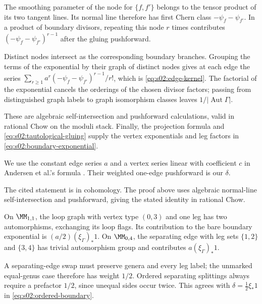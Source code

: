 \begin{prf}
The smoothing parameter of the node for $\{f,f'\}$ belongs to the
tensor product of its two tangent lines.  Its normal line therefore
has first Chern class $-\psi_f-\psi_{f'}$.  In a product of boundary
divisors, repeating this node $r$ times contributes
$(-\psi_f-\psi_{f'})^{r-1}$ after the gluing pushforward.

\smallskip\noindent Distinct nodes intersect as the corresponding boundary branches.
Grouping the terms of the exponential by their graph of distinct
nodes gives at each edge the series
$\sum_{r\geq1}a^r(-\psi_f-\psi_{f'})^{r-1}/r!$, which is
\eqref{eq:s02:edge-kernel}.  The factorial of the exponential cancels
the orderings of the chosen divisor factors; passing from distinguished
graph labels to graph isomorphism classes leaves
$1/|\operatorname{Aut}\Gamma|$.

\smallskip\noindent These are algebraic self-intersection and pushforward calculations,
valid in rational Chow on the moduli stack.  Finally, the projection
formula and \eqref{eq:s02:tautological-gluing} supply the vertex
exponentials and leg factors in \eqref{eq:s02:boundary-exponential}.
\end{prf}

\begin{rmk}
\label{rmk:s02:boundary-source}
We use the constant edge series $a$ and a vertex series linear with
coefficient $c$ in Andersen et al.'s formula
\cite[Lemma 3.10, (3.18)--(3.22)]{ABCDGLW23}.
Their weighted one-edge pushforward is our $\delta$.

The cited statement is in cohomology.  The proof above uses algebraic
normal-line self-intersection and pushforward, giving the stated
identity in rational Chow.
\end{rmk}

\begin{exm}
\label{exm:s02:one-edge-weights}
On $\MM_{1,1}$, the loop graph with vertex type $(0,3)$ and one leg
has two automorphisms, exchanging its loop flags.  Its contribution
to the bare boundary exponential is $(a/2)(\xi_\Gamma)_*1$.
On $\MM_{0,4}$, the separating edge with leg sets $\{1,2\}$ and
$\{3,4\}$ has trivial automorphism group and contributes
$a(\xi_\Gamma)_*1$.

A separating-edge swap must preserve genera and every leg label;
the unmarked equal-genus case therefore has weight $1/2$.
Ordered separating splittings always require a prefactor $1/2$,
since unequal sides occur twice.  This agrees with
$\delta=\frac12\xi_*1$ in \eqref{eq:s02:ordered-boundary}.
\end{exm}

